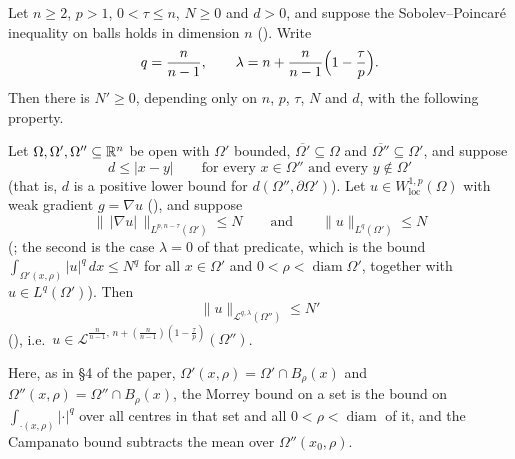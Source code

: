 \begin{lemma}[Lemma 4.2]
Let $n\ge2$, $p>1$, $0<\tau\le n$, $N\ge0$ and $d>0$, and suppose the
Sobolev--Poincar\'e inequality on balls holds in dimension $n$
().  Write
\[
q=\frac n{n-1},\qquad
\lambda=n+\frac n{n-1}\Bigl(1-\frac\tau p\Bigr).
\]
Then there is $N'\ge0$, depending only on $n$, $p$, $\tau$, $N$ and $d$, with the
following property.

Let $\Omega,\Omega',\Omega''\subseteq\mathbb{R}^n$ be open with $\Omega'$ bounded,
$\overline{\Omega'}\subseteq\Omega$ and $\overline{\Omega''}\subseteq\Omega'$,
and suppose
\[
d\le|x-y|\qquad\text{for every }x\in\Omega''\text{ and every }y\notin\Omega'
\]
(that is, $d$ is a positive lower bound for $d(\Omega'',\partial\Omega')$).  Let
$u\in W^{1,p}_{\mathrm{loc}}(\Omega)$ with weak gradient $g=\nabla u$
(), and suppose
\[
\|\,|\nabla u|\,\|_{L^{p,n-\tau}(\Omega')}\le N
\qquad\text{and}\qquad
\|u\|_{L^{q}(\Omega')}\le N
\]
(; the second is the case $\lambda=0$ of that predicate,
which is the bound $\int_{\Omega'(x,\rho)}|u|^q\,dx\le N^q$ for all
$x\in\Omega'$ and $0<\rho<\operatorname{diam}\Omega'$, together with
$u\in L^q(\Omega')$).  Then
\[
\|u\|_{\mathcal L^{q,\lambda}(\Omega'')}\le N'
\]
(), i.e.\
$u\in\mathcal L^{\frac n{n-1},\,n+(\frac n{n-1})(1-\frac\tau p)}(\Omega'')$.

Here, as in \S4 of the paper, $\Omega'(x,\rho)=\Omega'\cap B_\rho(x)$ and
$\Omega''(x,\rho)=\Omega''\cap B_\rho(x)$, the Morrey bound on a set is the
bound on $\int_{\cdot(x,\rho)}|\cdot|^q$ over all centres in that set and all
$0<\rho<\operatorname{diam}$ of it, and the Campanato bound subtracts the mean
over $\Omega''(x_0,\rho)$.


\end{lemma}
